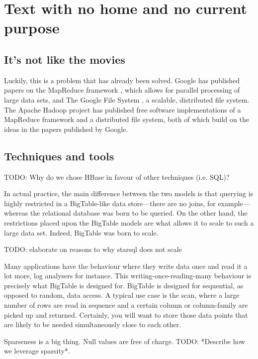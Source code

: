 \chapter{Text with no home and no current purpose}

\section{It's not like the movies}

Luckily, this is a problem that has already been solved. Google has published
papers on the MapReduce framework \cite{mapreduce}, which allows for parallel
processing of large data sets, and The Google File System \cite{gfs}, a
scalable, distributed file system. The Apache Hadoop \cite{hadoop} project has
published free software implementations of a MapReduce framework and a
distributed file system, both of which build on the ideas in the papers
published by Google.


\section{Techniques and tools}

TODO: Why do we chose HBase in favour of other techniques (i.e. SQL)?

In actual practice, the main difference between the two models is that
querying is highly restricted in a BigTable-like data store---there are no
joins, for example---whereas the relational database was born to be queried.
On the other hand, the restrictions placed upon the BigTable models are
what allows it to scale to such a large data set. Indeed, BigTable was born
to scale.

TODO: elaborate on reasons to why starsql does not scale

Many applications have the behaviour where they write data once and read it
a lot more, log analysers for instance. This writing-once-reading-many
behaviour is precisely what BigTable is designed for. BigTable is designed
for sequential, as opposed to random, data access. A typical use case is
the scan, where a large number of rows are read in sequence and a certain
column or column-family are picked up and returned. Certainly, you will
want to store those data points that are likely to be needed simultaneously
close to each other. \cite{bigtable}

Sparseness is a big thing. Null values are free of charge. TODO: *Describe
how we leverage sparsity*.



